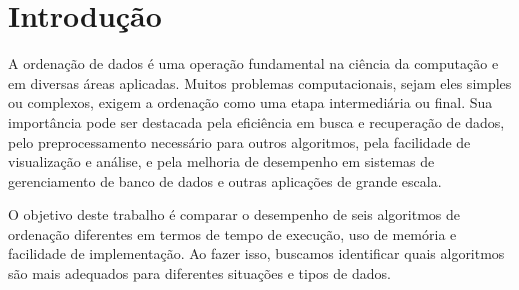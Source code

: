\documentclass[tcc2]{uftex}
\begin{document}


  \printlosymbols  
  \printloabbreviations
\mainmatter
\onehalfspacing
\chapter{Introdução}

A ordenação de dados é uma operação fundamental na ciência da computação e em diversas áreas aplicadas. Muitos problemas computacionais, sejam eles simples ou complexos, exigem a ordenação como uma etapa intermediária ou final. Sua importância pode ser destacada pela eficiência em busca e recuperação de dados, pelo preprocessamento necessário para outros algoritmos, pela facilidade de visualização e análise, e pela melhoria de desempenho em sistemas de gerenciamento de banco de dados e outras aplicações de grande escala.

O objetivo deste trabalho é comparar o desempenho de seis algoritmos de ordenação diferentes em termos de tempo de execução, uso de memória e facilidade de implementação. Ao fazer isso, buscamos identificar quais algoritmos são mais adequados para diferentes situações e tipos de dados. 
\end{document}
